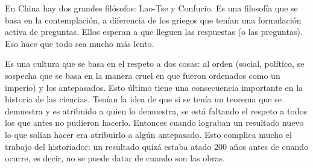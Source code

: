 En China hay dos grandes filósofos: Lao-Tse y Confucio. Es una filosofía que se basa en la contemplación, a diferencia de los griegos que tenían una formulación activa de preguntas. Ellos esperan a que lleguen las respuestas (o las preguntas). Eso hace que todo sea mucho más lento. 

Es una cultura que se basa en el respeto a dos cosas: al orden (social, político, se sospecha que se basa en la manera cruel en que fueron ordenados como un imperio) y los antepasados. Esto último tiene una consecuencia importante en la historia de las ciencias. Tenían la idea de que si se tenía un teorema que se demuestra y es atribuido a quien lo demuestra, se está faltando el respeto a todos los que antes no pudieron hacerlo. Entonces cuando lograban un resultado nuevo lo que solían hacer era atribuirlo a algún antepasado. Esto complica mucho el trabajo del historiador: un resultado quizá estaba atado 200 años antes de cuando ocurre, es decir, no se puede datar de cuando son las obras.